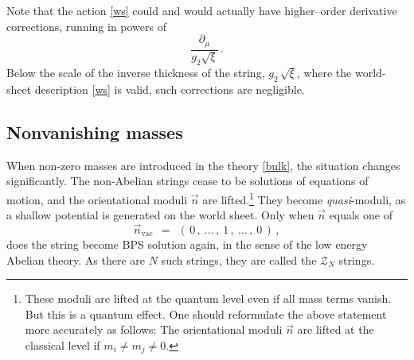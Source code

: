 \documentclass[12pt]{article}
\def\beq{\begin{equation}}
\def\eeq{\end{equation}}
\newcommand{\p}{\partial}
\newcommand{\mc}[1]{\mathcal{#1}}
\newcommand{\nvac}{\vec{n}{}_\text{vac}}
\begin{document}
	Note that the action \eqref{ws} could and would actually have higher--order derivative corrections, running in powers of
\beq
\label{higher}
	\frac{\p_\mu}{g_2\sqrt{\xi}}\,.
\eeq
	Below the scale of the inverse thickness of the string, $ g_2\,\sqrt{\xi} $, where the world-sheet
	description \eqref{ws} is valid, such corrections are negligible.


\subsection{Nonvanishing masses}

	When non-zero masses are introduced in the theory \eqref{bulk}, the situation changes significantly.
	The non-Abelian strings cease to be solutions of equations of motion, and the orientational moduli $ \vec{n} $ are lifted.\footnote{These moduli are lifted at the quantum level even if all mass terms vanish. But this is a quantum effect.
	One should reformulate the above statement more accurately as follows: The orientational moduli $ \vec{n} $ are lifted at the classical level if $m_i\neq m_j\neq 0$.}
	They become {\it quasi}-moduli, as a shallow potential is generated on the world sheet.
	Only when $ \vec{n} $ equals one of 
\beq
\label{nvac}
	\nvac    ~~=~~    (\, 0\,,~ \dots\,,~1\,,~ \dots\,,~ 0 \,)\,,
\eeq
	does the string become BPS solution  again, in the sense of the low energy Abelian theory.
	As there are $ N $ such strings, they are called the $ \mc{Z}_N $ strings.
\end{document}
